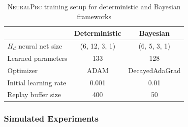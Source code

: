 \begin{table}[tb]
    \centering
    \caption{\textsc{NeuralPbc} training setup for deterministic and Bayesian frameworks}
    \begin{tabular}{lcc}
      \toprule
       & Deterministic & Bayesian \\
      \midrule
        $H_d$ neural net size & (6, 12, 3, 1) & (6, 5, 3, 1)\\
        Learned parameters & 133 & 128  \\
        Optimizer & \textsc{ADAM} & DecayedAdaGrad\\
        Initial learning rate & 0.001 & 0.01\\
        Replay buffer size & 400 & 50\\
      \bottomrule
    \end{tabular}
    \label{tab:training_setup_neuralpbc}
  \end{table}

\subsubsection{Simulated Experiments}


